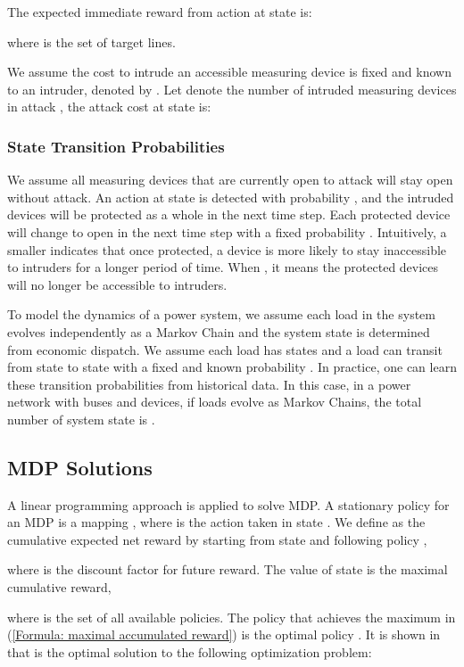 \documentclass[conference,letterpaper,10pt]{IEEEtran}
\begin{document}
The expected immediate reward from action  at state  is:

where  is the set of target lines. 

We assume the cost to intrude an accessible  measuring device is fixed and known to an intruder, denoted by . Let  denote the number of intruded measuring devices in attack , the attack cost at state  is:






\subsubsection{State Transition Probabilities}
We assume all measuring devices that are currently open to attack  will stay open without attack. An action  at state  is detected  with probability , and the intruded  devices will be protected as a whole in the next time step.  Each protected device will change to open in the next time step with a fixed probability . Intuitively,  a smaller  indicates that once protected, a device is more likely to stay inaccessible to intruders for a longer period of  time.  When , it means the protected devices will no longer be accessible to intruders.

To model the dynamics of a power system, we assume each load in the system evolves independently as a Markov Chain \cite{MP94} and the system state is determined from economic dispatch. We assume each load has  states and a load can transit from state  to state  with a fixed and known probability . In practice, one can learn these transition probabilities from historical data. In this case, in a power network with  buses and  devices, if  loads evolve as Markov Chains, the total number of system state is .




\subsection{MDP Solutions}\label{sec: MDP solution}
A linear programming approach \cite{FR03,MP94} is applied to solve MDP. A stationary policy  for an MDP is a mapping , where  is the action taken in state . We define  as the cumulative expected net reward by starting from state  and following policy , 

where  is the discount factor for future reward.
The value of state  is the maximal cumulative reward, 
 
where  is the set of all available policies. The policy that achieves the maximum in (\ref{Formula: maximal accumulated reward}) is the optimal policy .  It is shown in  \cite{FR03} that   is the optimal solution to  the following optimization problem:
\end{document}
